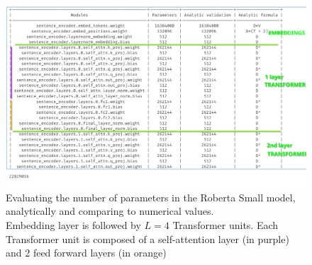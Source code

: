 \documentclass[a4paper]{article}
\begin{document}
\begin{figure}[ht]
    \centering
    \includegraphics[width=.6\textwidth]{figures/roberta_params.png}
    \caption{Evaluating the number of parameters in the Roberta Small model, analytically and comparing to numerical values. \\ 
    Embedding layer is followed by $L=4$ Transformer units. Each Transformer unit is composed of a self-attention layer (in purple) and 2 feed forward layers (in orange)}
    \label{fig:roberta_params}
\end{figure}
\end{document}
